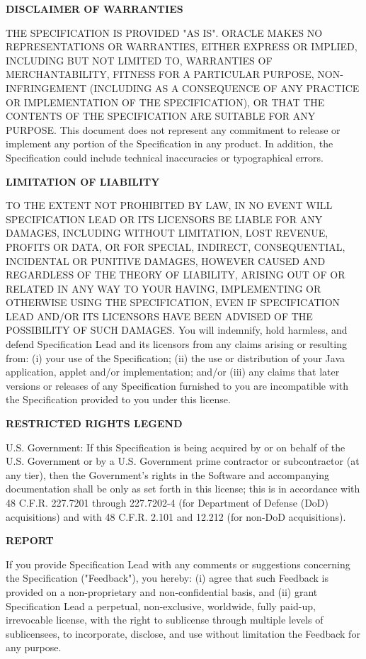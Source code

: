 \begin{flushleft}
{\bfseries DISCLAIMER OF WARRANTIES}

THE SPECIFICATION IS PROVIDED "AS IS". ORACLE MAKES NO REPRESENTATIONS OR WARRANTIES, 
EITHER EXPRESS OR IMPLIED, INCLUDING BUT NOT LIMITED TO, WARRANTIES OF MERCHANTABILITY, 
FITNESS FOR A PARTICULAR PURPOSE, NON-INFRINGEMENT (INCLUDING AS A CONSEQUENCE OF 
ANY PRACTICE OR IMPLEMENTATION OF THE SPECIFICATION), OR THAT THE CONTENTS OF THE 
SPECIFICATION ARE SUITABLE FOR ANY PURPOSE. This document does not represent any 
commitment to release or implement any portion of the Specification in any product. 
In addition, the Specification could include technical inaccuracies or typographical 
errors.

{\bfseries LIMITATION OF LIABILITY}

TO THE EXTENT NOT PROHIBITED BY LAW, IN NO EVENT WILL SPECIFICATION LEAD OR ITS 
LICENSORS BE LIABLE FOR ANY DAMAGES, INCLUDING WITHOUT LIMITATION, LOST REVENUE, 
PROFITS OR DATA, OR FOR SPECIAL, INDIRECT, CONSEQUENTIAL, INCIDENTAL OR PUNITIVE 
DAMAGES, HOWEVER CAUSED AND REGARDLESS OF THE THEORY OF LIABILITY, ARISING OUT OF 
OR RELATED IN ANY WAY TO YOUR HAVING, IMPLEMENTING OR OTHERWISE USING THE SPECIFICATION, 
EVEN IF SPECIFICATION LEAD AND/OR ITS LICENSORS HAVE BEEN ADVISED OF THE POSSIBILITY 
OF SUCH DAMAGES. 
You will indemnify, hold harmless, and defend Specification Lead and its licensors 
from any claims arising or resulting from: 
(i) your use of the Specification; 
(ii) the use or distribution of your Java application, applet and/or implementation; and/or 
(iii) any claims that later versions or releases of any Specification furnished 
to you are incompatible with the Specification provided to you under this license. 

{\bfseries RESTRICTED RIGHTS LEGEND}

U.S. Government: If this Specification is being acquired by or on behalf of the 
U.S. Government or by a U.S. Government prime contractor or subcontractor (at any tier), 
then the Government's rights in the Software and accompanying documentation shall be 
only as set forth in this license; this is in accordance with 48 C.F.R. 227.7201 
through 227.7202-4 (for Department of Defense (DoD) acquisitions) and with 48 C.F.R. 2.101 
and 12.212 (for non-DoD acquisitions). 

{\bfseries REPORT}

If you provide Specification Lead with any comments or suggestions concerning the 
Specification ("Feedback"), you hereby: 
(i) agree that such Feedback is provided 
on a non-proprietary and non-confidential basis, and 
(ii) grant Specification Lead a perpetual, non-exclusive, worldwide, fully paid-up, 
irrevocable license, with the right to sublicense through multiple levels of 
sublicensees, to incorporate, disclose, and use without limitation the Feedback 
for any purpose.


\end{flushleft}
